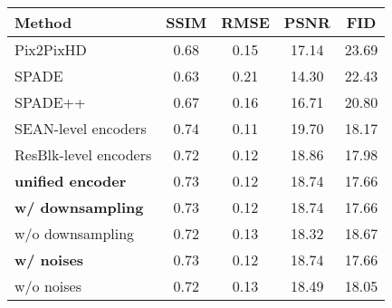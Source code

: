 \centering
\small
\begin{tabular}{lcccc} \toprule

Method                          &SSIM    &RMSE  &PSNR    &FID \\ \midrule
                       
Pix2PixHD~\cite{wang2018pix2pixHD}                       &0.68   &0.15   &17.14   &23.69\\
SPADE~\cite{park2019SPADE}                           &0.63   &0.21   &14.30   &22.43\\
SPADE++                         &0.67   &0.16   &16.71   &20.80\\ \midrule
SEAN-level encoders    &0.74   &0.11   &19.70   &18.17\\
ResBlk-level encoders           &0.72   &0.12   &18.86   &17.98\\
\bf{unified encoder}        &0.73   &0.12   &18.74   &17.66\\ \midrule
\bf{w/ downsampling}&0.73   &0.12   &18.74   &17.66\\ 
w/o downsampling        &0.72   &0.13   &18.32   &18.67\\ \midrule
\bf{w/ noises}              &0.73   &0.12   &18.74   &17.66\\
w/o noises                      &0.72   &0.13   &18.49   &18.05\\
\bottomrule

\end{tabular}